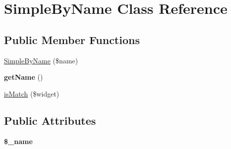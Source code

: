 \hypertarget{class_simple_by_name}{
\section{SimpleByName Class Reference}
\label{class_simple_by_name}
}
\subsection*{Public Member Functions}
\begin{DoxyCompactItemize}
\item 
\hyperlink{class_simple_by_name_ab0987827dd39bdcc4ed7cd3cd8f5b1ac}{SimpleByName} (\$name)
\item 
\hypertarget{class_simple_by_name_a475cd51b9f781a7308299241e6f29f27}{
{\bfseries getName} ()}
\label{class_simple_by_name_a475cd51b9f781a7308299241e6f29f27}

\item 
\hyperlink{class_simple_by_name_aa1a59df058107988656ed56f84954160}{isMatch} (\$widget)
\end{DoxyCompactItemize}
\subsection*{Public Attributes}
\begin{DoxyCompactItemize}
\item 
\hypertarget{class_simple_by_name_af1130184a357e63163aee7174b418469}{
{\bfseries \$\_\-name}}
\label{class_simple_by_name_af1130184a357e63163aee7174b418469}

\end{DoxyCompactItemize}


